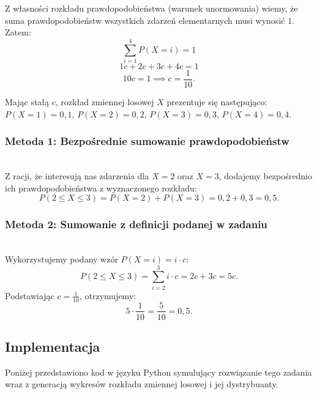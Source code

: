 \documentclass[12pt, a4paper]{article}
\begin{document}
Z własności rozkładu prawdopodobieństwa (warunek unormowania) wiemy, że suma prawdopodobieństw wszystkich zdarzeń elementarnych musi wynosić $1$. Zatem:
\[ \sum_{i=1}^{4} P(X=i) = 1 \]
\[ 1c + 2c + 3c + 4c = 1 \]
\[ 10c = 1 \implies c = \frac{1}{10}. \]

Mając stałą $c$, rozkład zmiennej losowej $X$ prezentuje się następująco:
$P(X=1)=0{,}1$, $P(X=2)=0{,}2$, $P(X=3)=0{,}3$, $P(X=4)=0{,}4$.

\subsubsection{Metoda 1: Bezpośrednie sumowanie prawdopodobieństw} \\
Z racji, że interesują nas zdarzenia dla $X=2$ oraz $X=3$, dodajemy bezpośrednio ich prawdopodobieństwa z wyznaczonego rozkładu:
\[ P(2 \le X \le 3) = P(X=2) + P(X=3) = 0{,}2 + 0{,}3 = 0{,}5. \]

\subsubsection{Metoda 2: Sumowanie z definicji podanej w zadaniu} \\
Wykorzystujemy podany wzór $P(X=i) = i \cdot c$:
\[ P(2 \le X \le 3) = \sum_{i=2}^{3} i \cdot c = 2c + 3c = 5c. \]
Podstawiając $c = \frac{1}{10}$, otrzymujemy:
\[ 5 \cdot \frac{1}{10} = \frac{5}{10} = 0{,}5. \]

\newpage

\subsection{Implementacja}{%
Poniżej przedstawiono kod w języku Python symulujący rozwiązanie tego zadania wraz z generacją wykresów rozkładu zmiennej losowej i jej dystrybuanty.
}
\end{document}

